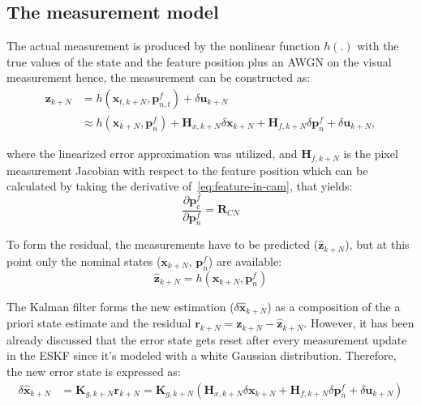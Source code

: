 \subsection{The measurement model}

The actual measurement is produced by the nonlinear function $h(.)$ with the true values of the state and the feature position plus an AWGN on the visual measurement hence, the measurement can be constructed as:
\begin{equation}
\begin{aligned}
    \mathbf{z}_{k+N} &= h(\mathbf{x}_{t,k+N},\mathbf{p}_{n,t}^f)+\delta\mathbf{u}_{k+N}\\
    &\approx h(\mathbf{x}_{k+N},\mathbf{p}_{n}^f)+\mathbf{H}_{x,k+N}\delta\mathbf{x}_{k+N}+\mathbf{H}_{f, k+N}\delta\mathbf{p}_{n}^f + \delta\mathbf{u}_{k+N},
\end{aligned}
\end{equation}

where the linearized error approximation was utilized, and $\mathbf{H}_{f,k+N}$ is the pixel measurement Jacobian with respect to the feature position which can be calculated by taking the derivative of~\eqref{eq:feature-in-cam}, that yields:
\begin{equation}
    \frac{\partial\mathbf{p}_c^f}{\partial\mathbf{p}_n^f}=\mathbf{R}_{CN}
\end{equation}

To form the residual, the measurements have to be predicted ($\hat{\mathbf{z}}_{k+N}$), but at this point only the nominal states ($\mathbf{x}_{k+N}$, $\mathbf{p}_n^f$) are available:
\begin{equation}
    \hat{\mathbf{z}}_{k+N} = h(\mathbf{x}_{k+N}, \mathbf{p}_n^f)
\end{equation}

The Kalman filter forms the new estimation ($\delta\hat{\mathbf{x}}_{k+N}$) as a composition of the a priori state estimate and the residual $\mathbf{r}_{k+N}=\mathbf{z}_{k+N}-\hat{\mathbf{z}}_{k+N}$. However, it has been already discussed that the error state gets reset after every measurement update in the ESKF since it's modeled with a white Gaussian distribution. Therefore, the new error state is expressed as:
\begin{equation}
\begin{aligned}
    \delta\hat{\mathbf{x}}_{k+N} &= \mathbf{K}_{g, k+N}\mathbf{r}_{k+N} = \mathbf{K}_{g, k+N}(\mathbf{H}_{x,k+N}\delta\mathbf{x}_{k+N}+\mathbf{H}_{f, k+N}\delta\mathbf{p}_{n}^f + \delta\mathbf{u}_{k+N})
\end{aligned}
\end{equation}


